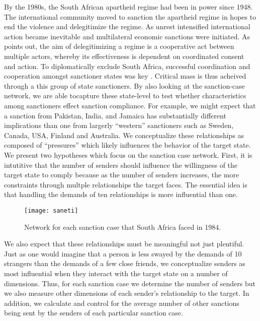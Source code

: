 By the 1980s, the South African apartheid regime had been in power since 1948. The international community moved to sanction the apartheid regime in hopes to end the violence and delegitimize the regime. As unrest intensified international action became inevitable and multilateral economic sanctions were initiated. As \citet{kinne2013dependent} points out, the aim of delegitimizing a regime is a cooperative act between multiple actors, whereby its effectiveness is dependent on coordinated consent and action. To diplomatically exclude South Africa, successful coordination and cooperation amongst sanctioner states was key \citep{kinne2013dependent,christopher1994pattern}. Critical mass is thus acheived through a this group of state sanctioners. By also looking at the sanction-case network, we are able tocapture these state-level to test whether characteristics among sanctioners effect sanction compliance. For example, we might expect that a sanction from Pakistan, India, and Jamaica has substantially different implications than one from largerly ``western'' sanctioners such as Sweden, Canada, USA, Finland and Australia. We conceptualize these relationships as composed of ``pressures'' which likely influences the behavior of the target state. We present two hypotheses which focus on the sanction case network. First, it is intutitive that the number of senders should influence the willingness of the target state to comply because as the number of senders increases, the more constraints through multple relationships the target faces. The essential idea is that handling the demands of ten relationships is more influential than one. 


\begin{figure}[ht]
	\centering
	\texttt{[image: saneti]}
	\caption{Network for each sanction case that South Africa faced in 1984.}
	\label{fig:saneti}
\end{figure}
\FloatBarrier


We also expect that these relationships must be meaningful not just plentiful. Just as one would imagine that a person is less swayed by the demands of 10 strangers than the demands of a few close friends, we conceptualize senders as most influential when they interact with the target state on a number of dimensions.  Thus, for each sanction case we determine the number of senders but we also measure other dimensions of each sender's relationship to the target. In addition, we calculate and control for the average number of other sanctions being sent by the senders of each particular sanction case.

